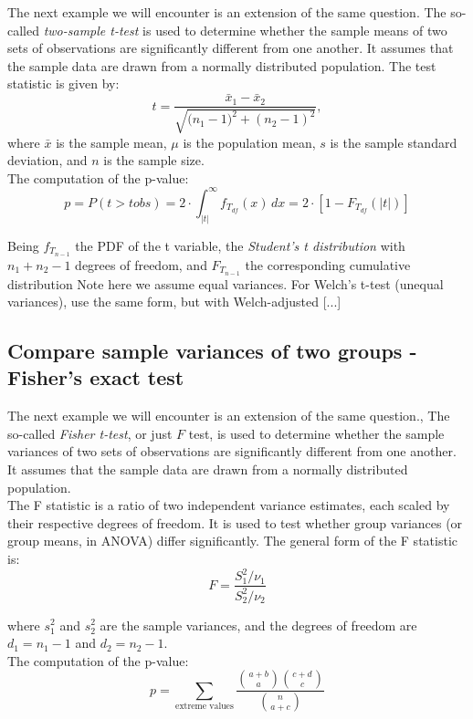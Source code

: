 \documentclass{book}
\begin{document}
The next example we will encounter is an extension of the same question. The so-called \textit{two-sample t-test} is used to determine whether the sample means of two sets of observations are significantly different from one another. It assumes that the sample data are drawn from a normally distributed population. The test statistic is given by:
\[
    t = \frac{\bar{x}_{1} - \bar{x}_{2}}{\sqrt{\big(n_{1} - 1)^{2} + (n_{2} - 1)^{2}}},
\]
where $\bar{x}$ is the sample mean, $\mu$ is the population mean, $s$ is the sample standard deviation, and $n$ is the sample size.\\

The computation of the p-value:
\[
p = P\left(t > t obs \right) = 2 \cdot \int_{|t|}^{\infty} f_{T_{df}}(x)\,dx = 2 \cdot \left[1 - F_{T_{df}}(|t|)\right]
\]

Being $f_{T_{n-1}}$ the PDF of the t variable, the \textit{Student's t distribution} with $n_1 + n_2 - 1$ degrees of freedom, and $F_{T_{n-1}}$ the corresponding cumulative distribution
Note here we assume equal variances. For Welch’s t-test (unequal variances), use the same form, but with Welch-adjusted [...]

\newpage

\subsection{Compare sample variances of two groups - Fisher's exact test}

The next example we will encounter is an extension of the same question., The so-called \textit{Fisher t-test}, or just $F$ test, is used to determine whether the sample variances of two sets of observations are significantly different from one another. It assumes that the sample data are drawn from a normally distributed population.\\

The F statistic is a ratio of two independent variance estimates, each scaled by their respective degrees of freedom. It is used to test whether group variances (or group means, in ANOVA) differ significantly. The general form of the F statistic is:
\[
F = \frac{S_1^2 / \nu_1}{S_2^2 / \nu_2}
\]

where $s_1^{2}$ and $s_2^{2}$ are the sample variances, and the degrees of freedom are $d_1 = n_1 - 1$ and $d_2 = n_2 - 1$.\\

The computation of the p-value:
\[
p = \sum_{\text{extreme values}} \frac{\binom{a+b}{a} \binom{c+d}{c}}{\binom{n}{a+c}}
\]
\end{document}
